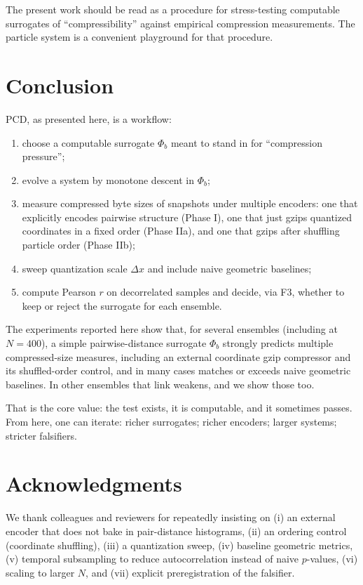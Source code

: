 \documentclass[11pt,a4paper]{article}
\numberwithin{equation}{section}
\newcommand{\phib}{\Phi_b}
\begin{document}
The present work should be read as a procedure for stress-testing computable surrogates of ``compressibility'' against empirical compression measurements. The particle system is a convenient playground for that procedure.

\section{Conclusion}
PCD, as presented here, is a workflow:

\begin{enumerate}[label=(\arabic*)]
\item choose a computable surrogate $\phib$ meant to stand in for ``compression pressure'';
\item evolve a system by monotone descent in $\phib$;
\item measure compressed byte sizes of snapshots under multiple encoders:
  one that explicitly encodes pairwise structure (Phase I),
  one that just gzips quantized coordinates in a fixed order (Phase IIa),
  and one that gzips after shuffling particle order (Phase IIb);
\item sweep quantization scale $\Delta x$ and include naive geometric baselines;
\item compute Pearson $r$ on decorrelated samples and decide, via F3, whether to keep or reject the surrogate for each ensemble.
\end{enumerate}

The experiments reported here show that, for several ensembles (including at $N{=}400$), a simple pairwise-distance surrogate $\phib$ strongly predicts multiple compressed-size measures, including an external coordinate gzip compressor and its shuffled-order control, and in many cases matches or exceeds naive geometric baselines. In other ensembles that link weakens, and we show those too.

That is the core value: the test exists, it is computable, and it sometimes passes. From here, one can iterate: richer surrogates; richer encoders; larger systems; stricter falsifiers.

\section*{Acknowledgments}
We thank colleagues and reviewers for repeatedly insisting on (i) an external encoder that does not bake in pair-distance histograms, (ii) an ordering control (coordinate shuffling), (iii) a quantization sweep, (iv) baseline geometric metrics, (v) temporal subsampling to reduce autocorrelation instead of naive $p$-values, (vi) scaling to larger $N$, and (vii) explicit preregistration of the falsifier.
\end{document}
